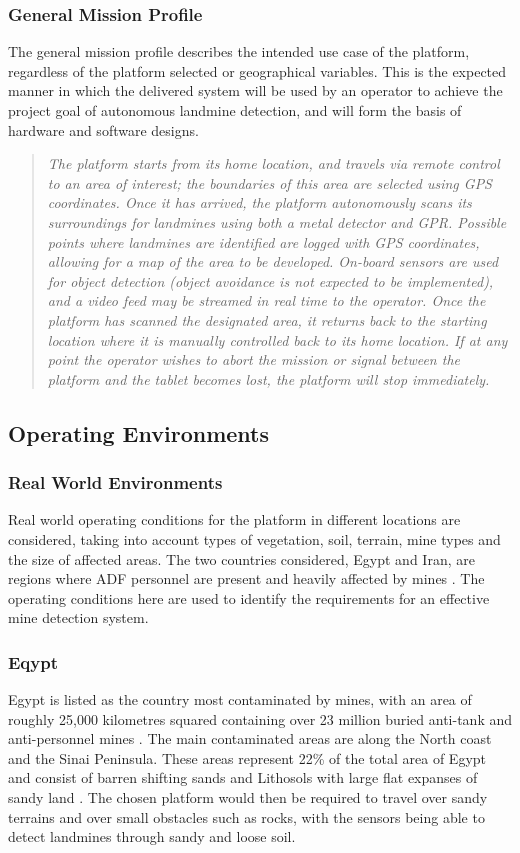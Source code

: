 \documentclass[main.tex]{subfiles}
\begin{document}
\subsubsection{General Mission Profile}
The general mission profile describes the intended use case of the platform, regardless of the platform selected or geographical variables. This is the expected manner in which the delivered system will be used by an operator to achieve the project goal of autonomous landmine detection, and will form the basis of hardware and software designs.
\begin{quote}\textit{The platform starts from its home location, and travels via remote control to an area of interest; the boundaries of this area are selected using GPS coordinates. Once it has arrived, the platform autonomously scans its surroundings for landmines using both a metal detector and GPR. Possible points where landmines are identified are logged with GPS coordinates, allowing for a map of the area to be developed. On-board sensors are used for object detection (object avoidance is not expected to be implemented), and a video feed may be streamed in real time to the operator. Once the platform has scanned the designated area, it returns back to the starting location where it is manually controlled back to its home location. If at any point the operator wishes to abort the mission or signal between the platform and the tablet becomes lost, the platform will stop immediately.}
\end{quote}
\subsection{Operating Environments}
\subsubsection{Real World Environments}

Real world operating conditions for the platform in different locations are considered, taking into account types of vegetation, soil, terrain, mine types and the size of affected areas. The two countries considered, Egypt and Iran, are regions where ADF personnel are present and heavily affected by mines \parencite{AustralianGovernment2016}. The operating conditions here are used to identify the requirements for an effective mine detection system.

\subsubsection{Eqypt}
Egypt is listed as the country most contaminated by mines, with an area of roughly 25,000 kilometres squared containing over 23 million buried anti-tank and anti-personnel mines \parencite{Rushfan2008}. The main contaminated areas are along the North coast and the Sinai Peninsula. These areas represent 22\% of the total area of Egypt and consist of barren shifting sands and Lithosols with large flat expanses of sandy land \parencite{Nahrawy2011}. The chosen platform would then be required to travel over sandy terrains and over small obstacles such as rocks, with the sensors being able to detect landmines through sandy and loose soil. 
\end{document}
